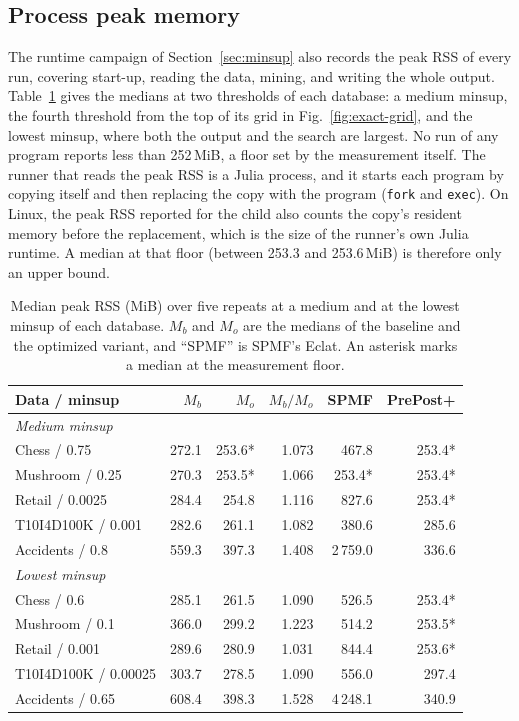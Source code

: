 \subsection{Process peak memory}
\label{sec:memory}
The runtime campaign of Section~\ref{sec:minsup} also records the peak RSS of every run,
covering start-up, reading the data, mining, and writing the whole output.
Table~\ref{tab:peak-rss} gives the medians at two thresholds of each database: a medium
minsup, the fourth threshold from the top of its grid in Fig.~\ref{fig:exact-grid}, and
the lowest minsup, where both the output and the search are largest. No run of any program reports less than
252\,MiB, a floor set by the measurement itself. The runner that reads the peak RSS is a
Julia process, and it starts each program by copying itself and then replacing the copy
with the program (\texttt{fork} and \texttt{exec}). On Linux, the peak RSS reported for
the child also counts the copy's resident memory before the replacement, which is the
size of the runner's own Julia runtime. A median at that floor (between 253.3 and
253.6\,MiB) is therefore only an upper bound.

\begin{table}[t]
\centering
\small
\setlength{\tabcolsep}{3pt}
\caption{Median peak RSS (MiB) over five repeats at a medium and at the lowest minsup of
each database. $M_b$ and $M_o$ are the medians of the baseline and the optimized variant,
and ``SPMF'' is SPMF's Eclat. An asterisk marks a median at the measurement floor.}
\label{tab:peak-rss}
\begin{tabular}{lrrrrr}
\hline
Data / minsup & $M_b$ & $M_o$ & $M_b/M_o$ & SPMF & PrePost+ \\
\hline
\multicolumn{6}{l}{\emph{Medium minsup}} \\
Chess / 0.75 & 272.1 & 253.6* & 1.073 & 467.8 & 253.4* \\
Mushroom / 0.25 & 270.3 & 253.5* & 1.066 & 253.4* & 253.4* \\
Retail / 0.0025 & 284.4 & 254.8 & 1.116 & 827.6 & 253.4* \\
T10I4D100K / 0.001 & 282.6 & 261.1 & 1.082 & 380.6 & 285.6 \\
Accidents / 0.8 & 559.3 & 397.3 & 1.408 & 2\,759.0 & 336.6 \\
\hline
\multicolumn{6}{l}{\emph{Lowest minsup}} \\
Chess / 0.6 & 285.1 & 261.5 & 1.090 & 526.5 & 253.4* \\
Mushroom / 0.1 & 366.0 & 299.2 & 1.223 & 514.2 & 253.5* \\
Retail / 0.001 & 289.6 & 280.9 & 1.031 & 844.4 & 253.6* \\
T10I4D100K / 0.00025 & 303.7 & 278.5 & 1.090 & 556.0 & 297.4 \\
Accidents / 0.65 & 608.4 & 398.3 & 1.528 & 4\,248.1 & 340.9 \\
\hline
\end{tabular}
\end{table}

